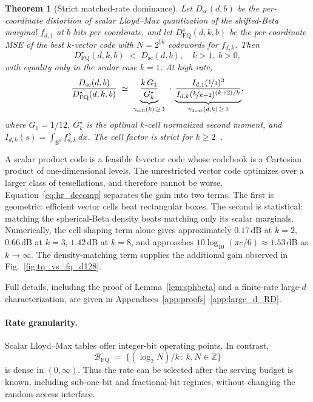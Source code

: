 \documentclass{article}
\newtheorem{theorem}{Theorem}
\theoremstyle{definition}
\theoremstyle{remark}
\newcommand{\bbB}{\mathbb{B}}
\newcommand{\bbZ}{\mathbb{Z}}
\begin{document}
\begin{theorem}[Strict matched-rate dominance]
\label{thm:dominance}
Let $D_{\mathrm{sc}}(d, b)$ be the per-coordinate distortion of
scalar Lloyd--Max quantization of the shifted-Beta marginal
$f_{d, 1}$ at $b$ bits per coordinate, and let
$D_{\mathrm{FQ}}^\star(d, k, b)$ be the per-coordinate MSE of the
best $k$-vector code with $N = 2^{bk}$ codewords for $f_{d, k}$.
Then
\begin{equation}
D_{\mathrm{FQ}}^\star(d, k, b) \;<\; D_{\mathrm{sc}}(d, b),
\quad k > 1, \;b > 0,
\label{eq:strict-dom}
\end{equation}
with equality only in the scalar case $k = 1$.  At high rate,
\begin{equation}
\frac{D_{\mathrm{sc}}(d, b)}{D_{\mathrm{FQ}}^\star(d, k, b)}
\;\simeq\;
\underbrace{\frac{k\,G_1}{G_k^\star}}_{\gamma_{\mathrm{cell}}(k)\,\geq\,1}
\;\cdot\;
\underbrace{\frac{I_{d, 1}(\nicefrac{1}{3})^3}
{I_{d, k}(\nicefrac{k}{k + 2})^{(k + 2)/k}}}_{\gamma_{\mathrm{dens}}(d, k)\,\geq\,1},
\label{eq:hr_decomp}
\end{equation}
where $G_1 = 1/12$, $G_k^\star$ is the optimal $k$-cell normalized
second moment, and $I_{d, k}(s) = \int_{\bbB^k} f_{d, k}^{\,s}\,dx$.
The cell factor is strict for $k \geq
2$~\citep{conway1999sphere, gersho1979asymptotic}.
\end{theorem}

A scalar product code is a feasible $k$-vector code whose codebook
is a Cartesian product of one-dimensional levels.  The
unrestricted vector code optimizes over a larger class of
tessellations, and therefore cannot be worse.
Equation~\eqref{eq:hr_decomp} separates the gain into two terms.
The first is geometric: efficient vector cells beat rectangular
boxes.  The second is statistical: matching the spherical-Beta
density beats matching only its scalar marginals.  Numerically, the
cell-shaping term alone gives approximately $0.17$\,dB at $k = 2$,
$0.66$\,dB at $k = 3$, $1.42$\,dB at $k = 8$, and approaches
$10\log_{10}(\pi e/6) \approx 1.53$\,dB as $k \to \infty$.  The
density-matching term supplies the additional gain observed in
Fig.~\ref{fig:tq_vs_fq_d128}.

Full details, including the proof of Lemma~\ref{lem:sphbeta} and a
finite-rate large-$d$ characterization, are given in
Appendices~\ref{app:proofs}--\ref{app:large_d_RD}.

\paragraph{Rate granularity.}
\label{sec:rate_granularity}
Scalar Lloyd--Max tables offer integer-bit operating points.  In
contrast,
\begin{equation}
\mathcal{B}_{\mathrm{FQ}}
\;=\;
\{(\log_2 N)/k\,:\, k, N \in \bbZ\}
\end{equation}
is dense in $(0, \infty)$.  Thus the rate can be selected after the
serving budget is known, including sub-one-bit and fractional-bit
regimes, without changing the random-access interface.
\end{document}
